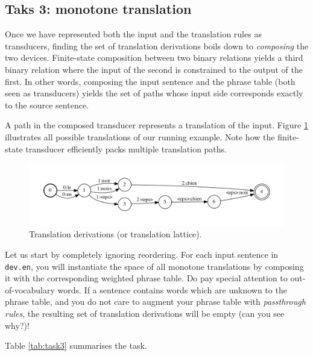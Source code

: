 \subsection{Taks 3: monotone translation}

Once we have represented both the input and the translation rules as transducers, finding the set of translation derivations boils down to \emph{composing} the two devices.
Finite-state composition between two binary relations yields a third binary relation where the input of the second is constrained to the output of the first.
In other words, composing the input sentence and the phrase table (both seen as transducers) yields the set of paths whose input side corresponds exactly to the source sentence.

A path in the composed transducer represents a translation of the input. 
 Figure \ref{fig:lattice} illustrates all possible translations of our running example.
 Note how the finite-state transducer efficiently packs multiple translation paths.

\begin{figure}[h]\centering
\includegraphics[scale=0.5]{lattice-monotone}
\caption{\label{fig:lattice}Translation derivations (or translation lattice).}
\end{figure}


Let us start by completely ignoring reordering.
For each input sentence in \texttt{dev.en}, you will instantiate the space of all monotone translations by composing it with the corresponding weighted phrase table.
Do pay special attention to out-of-vocabulary words. 
If a sentence contains words which are unknown to the phrase table, and you do not care to augment your phrase table with \emph{passthrough rules}, the resulting set of translation derivations will be empty (can you see why?)! 

Table \ref{tab:task3} summarises the task. 

